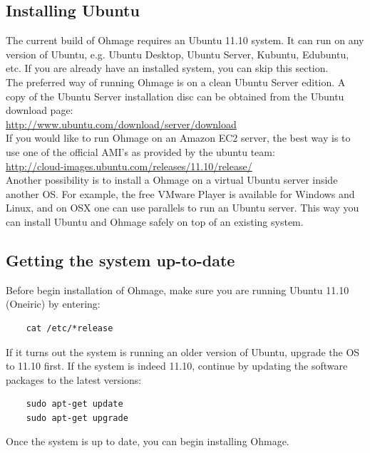 \documentclass{scrartcl}
\begin{document}
\subsection{Installing Ubuntu}

\noindent The current build of Ohmage requires an Ubuntu 11.10 system. It can
run on any version of Ubuntu, e.g. Ubuntu Desktop, Ubuntu Server, Kubuntu, Edubuntu,
etc. If you are already have an installed system, you can skip this section. \\

\noindent The preferred way of running Ohmage is on a clean Ubuntu Server
edition. A copy of the Ubuntu Server installation disc can be obtained from the
Ubuntu download page: \\

\url{http://www.ubuntu.com/download/server/download} \\

\noindent If you would like to run Ohmage on an Amazon EC2 server, the best way
is to use one of the official AMI's as provided by the ubuntu team: \\

\url{http://cloud-images.ubuntu.com/releases/11.10/release/} \\

\noindent Another possibility is to install a Ohmage on a virtual Ubuntu server
inside another OS. For example, the free VMware Player is available for Windows 
and Linux, and on OSX one can use parallels to run an Ubuntu server. This way
you can install Ubuntu and Ohmage safely on top of an existing system.

\subsection{Getting the system up-to-date}

\noindent Before begin installation of Ohmage, make sure you are running Ubuntu
11.10 (Oneiric) by entering:

\begin{verbatim}
    cat /etc/*release
\end{verbatim}
If it turns out the system is running an older version of Ubuntu, upgrade the OS
to 11.10 first. If the system is indeed 11.10, continue by updating the software packages to the latest versions:

\begin{verbatim}
    sudo apt-get update
    sudo apt-get upgrade
\end{verbatim}
Once the system is up to date, you can begin installing Ohmage.
\end{document}
